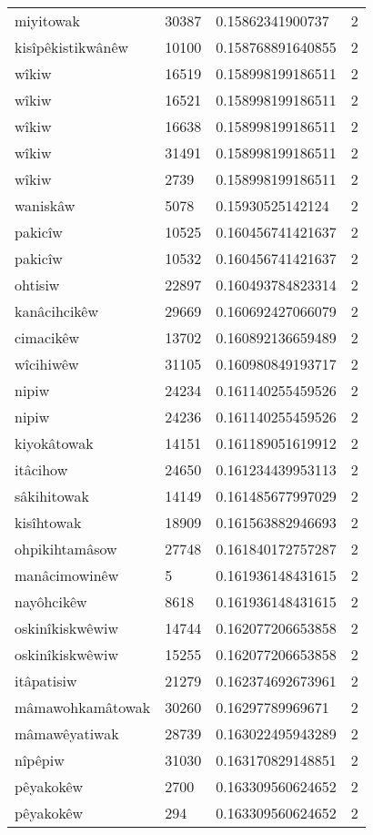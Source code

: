 \begin{longtable}{llll}
miyitowak & 30387 & 0.15862341900737 & 2 \\
kisîpêkistikwânêw & 10100 & 0.158768891640855 & 2 \\
wîkiw & 16519 & 0.158998199186511 & 2 \\
wîkiw & 16521 & 0.158998199186511 & 2 \\
wîkiw & 16638 & 0.158998199186511 & 2 \\
wîkiw & 31491 & 0.158998199186511 & 2 \\
wîkiw & 2739 & 0.158998199186511 & 2 \\
waniskâw & 5078 & 0.15930525142124 & 2 \\
pakicîw & 10525 & 0.160456741421637 & 2 \\
pakicîw & 10532 & 0.160456741421637 & 2 \\
ohtisiw & 22897 & 0.160493784823314 & 2 \\
kanâcihcikêw & 29669 & 0.160692427066079 & 2 \\
cimacikêw & 13702 & 0.160892136659489 & 2 \\
wîcihiwêw & 31105 & 0.160980849193717 & 2 \\
nipiw & 24234 & 0.161140255459526 & 2 \\
nipiw & 24236 & 0.161140255459526 & 2 \\
kiyokâtowak & 14151 & 0.161189051619912 & 2 \\
itâcihow & 24650 & 0.161234439953113 & 2 \\
sâkihitowak & 14149 & 0.161485677997029 & 2 \\
kisîhtowak & 18909 & 0.161563882946693 & 2 \\
ohpikihtamâsow & 27748 & 0.161840172757287 & 2 \\
manâcimowinêw & 5 & 0.161936148431615 & 2 \\
nayôhcikêw & 8618 & 0.161936148431615 & 2 \\
oskinîkiskwêwiw & 14744 & 0.162077206653858 & 2 \\
oskinîkiskwêwiw & 15255 & 0.162077206653858 & 2 \\
itâpatisiw & 21279 & 0.162374692673961 & 2 \\
mâmawohkamâtowak & 30260 & 0.16297789969671 & 2 \\
mâmawêyatiwak & 28739 & 0.163022495943289 & 2 \\
nîpêpiw & 31030 & 0.163170829148851 & 2 \\
pêyakokêw & 2700 & 0.163309560624652 & 2 \\
pêyakokêw & 294 & 0.163309560624652 & 2 \\

\end{longtable}
